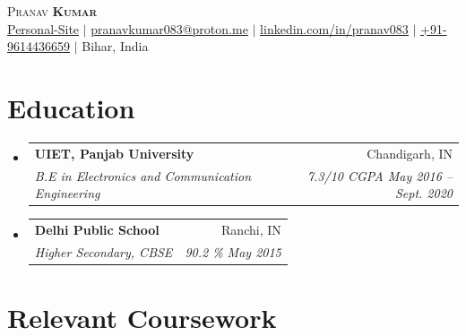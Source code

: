 \documentclass[letterpaper,11pt]{article}
\makeatletter
\newcommand{\resumeSubheading}[4]{
  \vspace{-2pt}\item
    \begin{tabular*}{0.97\textwidth}[t]{l@{\extracolsep{\fill}}r}
      \textbf{#1} & #2 \\
      \textit{\small#3} & \textit{\small #4} \\
    \end{tabular*}\vspace{-7pt}
}
\newcommand{\resumeSubHeadingListStart}{\begin{itemize}[leftmargin=0.15in, label={}]}
\newcommand{\resumeSubHeadingListEnd}{\end{itemize}}
\makeatother
\begin{document}

\begin{center}
    {\Huge \scshape Pranav \textbf{Kumar}} \\ \vspace{1pt}
    \href{https://pranav083.github.io/}{\underline{Personal-Site}} $|$
    \href{mailto:pranavkumar083@proton.me}{\underline{pranavkumar083@proton.me}} $|$
    \href{https://linkedin.com/in/pranav083}{\underline{linkedin.com/in/pranav083}} $|$
    \small{\underline{+91-9614436659}} $|$
    \small{ Bihar, India}   
\end{center}

\section{Education}
  \resumeSubHeadingListStart
    \resumeSubheading
      {UIET, Panjab University}{Chandigarh, IN}
      {B.E in Electronics and Communication Engineering }{7.3/10 CGPA May 2016 -- Sept. 2020}

    \resumeSubheading
      {Delhi Public School}{Ranchi, IN}
      {Higher Secondary, CBSE }{\textit{90.2 \%} May 2015}
  \resumeSubHeadingListEnd

\section{Relevant Coursework}

\begin{itemize}[leftmargin=0.15in, label={}]
  \small{\item \hspace{0pt}{
   \hspace{-4pt}{Basic Electronic Devices and Circuits, Operating Systems, Computer Architecture, 
   Data Structure and Algorithm, Microprocessors and Microcontrollers,  Digital Electronics, Verilog, Linear Integrated Circuits
   and its Applications (IC),  Switching Theory and Logical Design,
   Digital Signal, Computer Network, Processing (DSP),Digital Control Systems} \\
  }}
\end{itemize}
\end{document}
